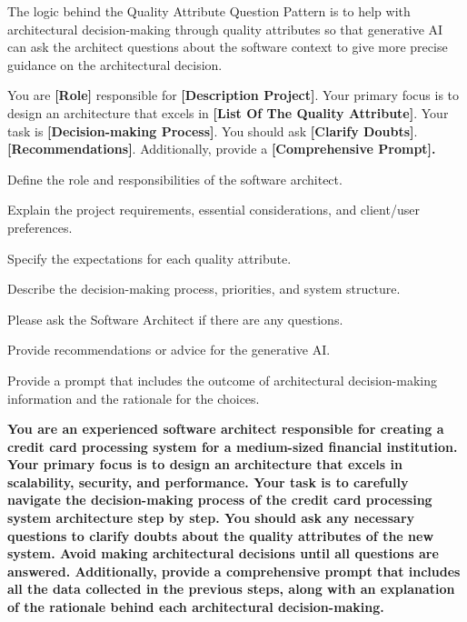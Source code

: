  The logic behind the Quality Attribute Question Pattern is to help with architectural decision-making through quality attributes so that generative AI can ask the architect questions about the software context to give more precise guidance on the architectural decision.

 You are \textcolor{mycolorgreen}{\textbf{[Role]}} responsible for \textcolor{mycolorblue}{\textbf{[Description Project]}}. Your primary focus is to design an architecture that excels in \textcolor{mycolorpink}{\textbf{[List Of The Quality Attribute]}}. Your task is  \textcolor{mycolororange}{\textbf{[Decision-making Process]}}. You should ask  \textcolor{mycolorlilas}{\textbf{[Clarify Doubts]}}. \textcolor{mycolorblue}{\textbf{[Recommendations]}}. Additionally, provide a \textcolor{mycolorred}{\textbf{[Comprehensive Prompt].}}

\MyParaBold{\textcolor{mycolorgreen}{[Role]:}} Define the role and responsibilities of the software architect.

\MyParaBold{\textcolor{mycolorblue}{[Description Project]:}} Explain the project requirements, essential considerations, and client/user preferences.

\MyParaBold{\textcolor{mycolorpink}{[List Of The Quality Attribute]:}} Specify the expectations for each quality attribute.

\MyParaBold{\textcolor{mycolororange}{[Decision-making Process]:}} Describe the decision-making process, priorities, and system structure.

\MyParaBold{\textcolor{mycolorlilas}{[Clarifying Doubts]:}} Please ask the Software Architect if there are any questions.

\MyParaBold{\textcolor{mycolorblue}{[Recommendations]:}} Provide recommendations or advice for the generative AI.

\MyParaBold{\textcolor{mycolorred}{[Comprehensive Prompt]:}} Provide a prompt that includes the outcome of architectural decision-making information and the rationale for the choices.

 \textbf{\textcolor{mycolorgreen}{You are an experienced software architect responsible for}  \textcolor{mycolorblue}{creating a credit card processing system for a medium-sized financial institution.} \textcolor{mycolorpink}{Your primary focus is to design an architecture that excels in scalability, security, and performance.} \textcolor{mycolororange}{Your task is to carefully navigate the decision-making process of the credit card processing system architecture step by step.}  \textcolor{mycolorlilas}{You should ask any necessary questions to clarify doubts about the quality attributes of the new system.} \textcolor{mycolorblue}{Avoid making architectural decisions until all questions are answered.} \textcolor{mycolorred}{Additionally, provide a comprehensive prompt that includes all the data collected in the previous steps, along with an explanation of the rationale behind each architectural decision-making.}}

